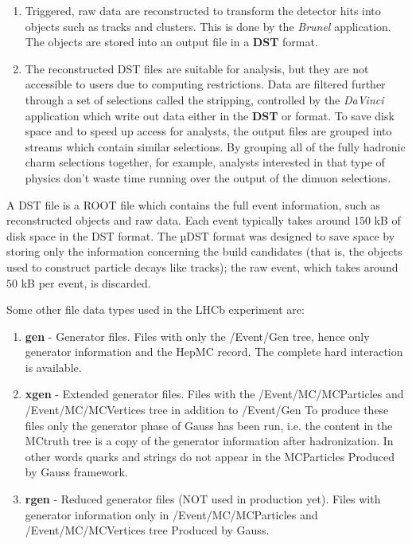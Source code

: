 \documentclass[11pt,a4paper,twoside]{article}
\begin{document}
\begin{enumerate}
\begin{enumerate}
            \item Triggered, raw data are reconstructed to transform the detector hits into objects such as tracks and clusters. This is done by the \textit{Brunel} application. The objects are stored into an output file in a \textbf{DST} format.

            \item The reconstructed DST files are suitable for analysis, but they are not accessible to users due to computing restrictions. Data are filtered further through a set of selections called the stripping, controlled by the \textit{DaVinci} application which write out data either in the \textbf{DST} or  format. To save disk space and to speed up access for analysts, the output files are grouped into streams which contain similar selections. By grouping all of the fully hadronic charm selections together, for example, analysts interested in that type of physics don’t waste time running over the output of the dimuon selections.
        \end{enumerate}

    A DST file is a ROOT file which contains the full event information, such as reconstructed objects and raw data. Each event typically takes around $150$ kB of disk space in the DST format. The µDST format was designed to save space by storing only the information concerning the build candidates (that is, the objects used to construct particle decays like tracks); the raw event, which takes around $50$ kB per event, is discarded.
        

    Some other file data types used in the LHCb experiment are:\cite{The-GAUSS-Framework}

    \begin{enumerate}
        \item \textbf{gen} - Generator files. Files with only the /Event/Gen tree, hence only generator information and the HepMC record. The complete hard interaction is available.

        \item \textbf{xgen} - Extended generator files. Files with the /Event/MC/MCParticles and /Event/MC/MCVertices tree in addition to /Event/Gen To produce these files only the generator phase of Gauss has been run, i.e. the content in the MCtruth tree is a copy of the generator information after hadronization. In other words quarks and strings do not appear in the MCParticles Produced by Gauss framework.

        \item \textbf{rgen} - Reduced generator files (NOT used in production yet). Files with generator information only in /Event/MC/MCParticles and /Event/MC/MCVertices tree Produced by Gauss.


\end{enumerate}
\end{enumerate}
\end{document}
